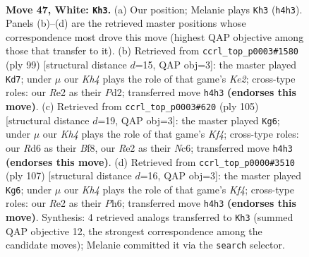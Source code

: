 \documentclass[11pt]{article}
\begin{document}
\clearpage

\begin{figure}[p]\centering
\begin{subfigure}{0.46\textwidth}\centering
\resizebox{\linewidth}{!}{%
\newchessgame
\chessboard[
  setfen={6k1/1r4b1/3R4/8/2P4K/4N3/4R3/8 w - - 14 47},
  showmover=false,
  pgfstyle=straightmove, color=movearrow, markmove={h4-h3}
]}
\caption{}
\end{subfigure}\hfill
\begin{subfigure}{0.46\textwidth}\centering
\resizebox{\linewidth}{!}{%
\newchessgame
\chessboard[
  setfen={8/4k3/2r5/8/8/1B4R1/1K1p4/8 b - - 0 50},
  showmover=false,
  pgfstyle=straightmove, color=movearrow, markmove={e7-d7}
]}
\caption{}
\end{subfigure}
\\[4pt]
\begin{subfigure}{0.46\textwidth}\centering
\resizebox{\linewidth}{!}{%
\newchessgame
\chessboard[
  setfen={5b2/8/2n5/p4k2/N6P/4B3/4K3/8 b - - 3 53},
  showmover=false,
  pgfstyle=straightmove, color=movearrow, markmove={f5-g6}
]}
\caption{}
\end{subfigure}\hfill
\begin{subfigure}{0.46\textwidth}\centering
\resizebox{\linewidth}{!}{%
\newchessgame
\chessboard[
  setfen={8/R7/7p/5k2/7r/4KB2/8/8 b - - 0 54},
  showmover=false,
  pgfstyle=straightmove, color=movearrow, markmove={f5-g6}
]}
\caption{}
\end{subfigure}
\caption{\textbf{Move 47, White: \texttt{Kh3}.} (a) Our position; Melanie plays \texttt{Kh3} (\texttt{h4h3}). Panels (b)--(d) are the retrieved master positions whose correspondence most drove this move (highest QAP objective among those that transfer to it). (b) Retrieved from \texttt{ccrl\_top\_p0003\#1580} (ply 99) [structural distance $d$=15, QAP obj=3]: the master played \texttt{Kd7}; under $\mu$ our \emph{Kh4} plays the role of that game's \emph{Ke2}; cross-type roles: our \emph{R}e2 as their \emph{P}d2; transferred move \texttt{h4h3} \textbf{(endorses this move)}. (c) Retrieved from \texttt{ccrl\_top\_p0003\#620} (ply 105) [structural distance $d$=19, QAP obj=3]: the master played \texttt{Kg6}; under $\mu$ our \emph{Kh4} plays the role of that game's \emph{Kf4}; cross-type roles: our \emph{R}d6 as their \emph{B}f8, our \emph{R}e2 as their \emph{N}c6; transferred move \texttt{h4h3} \textbf{(endorses this move)}. (d) Retrieved from \texttt{ccrl\_top\_p0000\#3510} (ply 107) [structural distance $d$=16, QAP obj=3]: the master played \texttt{Kg6}; under $\mu$ our \emph{Kh4} plays the role of that game's \emph{Kf4}; cross-type roles: our \emph{R}e2 as their \emph{P}h6; transferred move \texttt{h4h3} \textbf{(endorses this move)}. Synthesis: 4 retrieved analogs transferred to \texttt{Kh3} (summed QAP objective 12, the strongest correspondence among the candidate moves); Melanie committed it via the \texttt{search} selector.}
\label{fig:thought-m92}
\end{figure}
\end{document}
